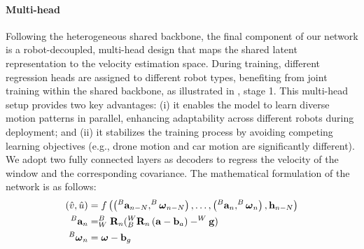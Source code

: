 


\paragraph{Multi-head}
Following the heterogeneous shared backbone, the final component of our network is a robot-decoupled, multi-head design that maps the shared latent representation to the velocity estimation space. During training, different regression heads are assigned to different robot types, benefiting from joint training within the shared backbone, as illustrated in , stage 1. This multi-head setup provides two key advantages: (i) it enables the model to learn diverse motion patterns in parallel, enhancing adaptability across different robots during deployment; and (ii) it stabilizes the training process by avoiding competing learning objectives (e.g., drone motion and car motion are significantly different).
We adopt two fully connected layers as decoders to regress the velocity of the window and the corresponding covariance.
The mathematical formulation of the network is as follows:
\vspace{-1mm}
\begin{equation}
\begin{aligned}
\vspace{-2mm}
(\hat{v}, \hat{u}) &= f\left(\left( ^B \mathbf{a}_{n-N}, ^B \boldsymbol{\omega}_{n-N} \right), \dots, \left( ^B \mathbf{a}_n, ^B \boldsymbol{\omega}_n \right), \mathbf{h}_{n-N} \right) \\
^B \mathbf{a}_n &= ^B_W\mathbf{R}_n (^W_B \mathbf{R}_n \left( \mathbf{a} - \mathbf{b}_a \right) - ^W \mathbf{g} )\\
^B \boldsymbol{\omega}_n &= \boldsymbol
{\omega} - \mathbf{b}_g 
\end{aligned}
\end{equation}

